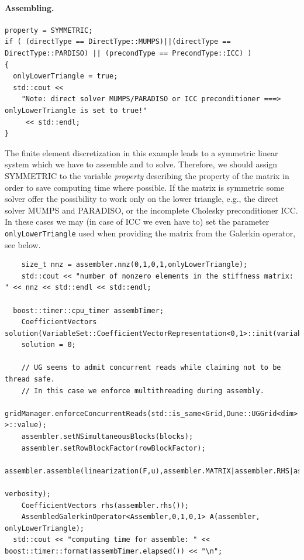 \documentclass[11pt]{article}
\begin{document}
\paragraph{Assembling.}\qquad \qquad

\begin{lstlisting}
property = SYMMETRIC;
if ( (directType == DirectType::MUMPS)||(directType == DirectType::PARDISO) || (precondType == PrecondType::ICC) )
{
  onlyLowerTriangle = true;
  std::cout << 
    "Note: direct solver MUMPS/PARADISO or ICC preconditioner ===> onlyLowerTriangle is set to true!" 
     << std::endl;
}
\end{lstlisting}

The finite element discretization in this example leads to a symmetric linear system which we have to assemble and to solve.
Therefore, we should assign {\sc SYMMETRIC} to the variable {\em property} describing the property of the matrix in
order to save computing time where possible. 
If the matrix is symmetric some solver offer the possibility to work only
on the lower triangle, e.g., the direct solver {\sc MUMPS} and {\sc PARADISO}, or the 
incomplete Cholesky preconditioner {\sc ICC}. In these cases we may (in case of {\sc ICC} we even have to) 
set the parameter {\tt onlyLowerTriangle} 
used when providing the matrix from the Galerkin operator, see below.

\begin{lstlisting}
	size_t nnz = assembler.nnz(0,1,0,1,onlyLowerTriangle);
	std::cout << "number of nonzero elements in the stiffness matrix: " << nnz << std::endl << std::endl;
	
  boost::timer::cpu_timer assembTimer;
	CoefficientVectors solution(VariableSet::CoefficientVectorRepresentation<0,1>::init(variableSet));
	solution = 0;
	
	// UG seems to admit concurrent reads while claiming not to be thread safe.
	// In this case we enforce multithreading during assembly.
	gridManager.enforceConcurrentReads(std::is_same<Grid,Dune::UGGrid<dim> >::value);
	assembler.setNSimultaneousBlocks(blocks);
	assembler.setRowBlockFactor(rowBlockFactor);
	assembler.assemble(linearization(F,u),assembler.MATRIX|assembler.RHS|assembler.VALUE,nthreads,
	                                                                                      verbosity);
	CoefficientVectors rhs(assembler.rhs());
	AssembledGalerkinOperator<Assembler,0,1,0,1> A(assembler, onlyLowerTriangle);
  std::cout << "computing time for assemble: " << boost::timer::format(assembTimer.elapsed()) << "\n";
\end{lstlisting}
\end{document}

